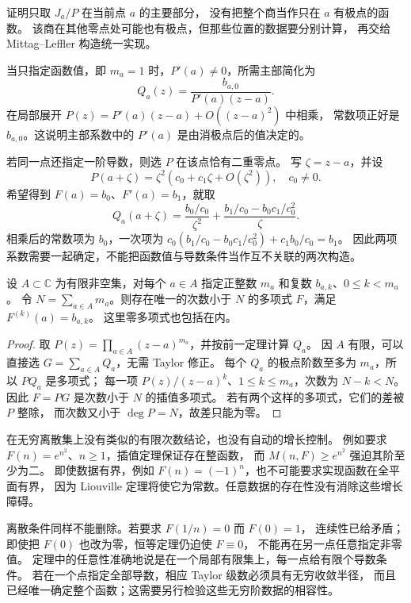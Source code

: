 证明只取 \(J_a/P\) 在当前点 \(a\) 的主要部分，
没有把整个商当作只在 \(a\) 有极点的函数。
该商在其他零点处可能也有极点，但那些位置的数据要分别计算，
再交给 Mittag–Leffler 构造统一实现。

\ProseParagraphBreak
当只指定函数值，即 \(m_a=1\) 时，\(P'(a)\ne0\)，所需主部简化为
\[
 Q_a(z)=\frac{b_{a,0}}{P'(a)(z-a)}.
\]
在局部展开 \(P(z)=P'(a)(z-a)+O((z-a)^2)\) 中相乘，
常数项正好是 \(b_{a,0}\)。这说明主部系数中的 \(P'(a)\) 是由消极点后的值决定的。

\ProseParagraphBreak
若同一点还指定一阶导数，则选 \(P\) 在该点恰有二重零点。
写 \(\zeta=z-a\)，并设
\[
 P(a+\zeta)=\zeta^2(c_0+c_1\zeta+O(\zeta^2)),\quad c_0\ne0.
\]
希望得到 \(F(a)=b_0\)、\(F'(a)=b_1\)，就取
\[
 Q_a(a+\zeta)
 =\frac{b_0/c_0}{\zeta^2}
   +\frac{b_1/c_0-b_0c_1/c_0^2}{\zeta}.
\]
相乘后的常数项为 \(b_0\)，一次项为
\(c_0(b_1/c_0-b_0c_1/c_0^2)+c_1b_0/c_0=b_1\)。
因此两项系数需要一起确定，不能把函数值与导数条件当作互不关联的两次构造。

\begin{corollary}[有限点上的多项式插值]\label{b3:cor:20-hermite-polynomial}
设 \(A\subset\mathbb C\) 为有限非空集，对每个 \(a\in A\) 指定正整数
\(m_a\) 和复数 \(b_{a,k}\)、\(0\le k<m_a\)。
令 \(N=\sum_{a\in A}m_a\)。则存在唯一的次数小于 \(N\) 的多项式
\(F\)，满足 \(F^{(k)}(a)=b_{a,k}\)。
这里零多项式也包括在内。
\end{corollary}
\begin{proof}
取 \(P(z)=\prod_{a\in A}(z-a)^{m_a}\)，并按前一定理计算 \(Q_a\)。
因 \(A\) 有限，可以直接选 \(G=\sum_{a\in A}Q_a\)，无需 Taylor 修正。
每个 \(Q_a\) 的极点阶数至多为 \(m_a\)，所以 \(P Q_a\) 是多项式；
每一项 \(P(z)/(z-a)^k\)、\(1\le k\le m_a\)，次数为 \(N-k<N\)。
因此 \(F=P G\) 是次数小于 \(N\) 的插值多项式。
若有两个这样的多项式，它们的差被 \(P\) 整除，
而次数又小于 \(\deg P=N\)，故差只能为零。
\end{proof}

在无穷离散集上没有类似的有限次数结论，也没有自动的增长控制。
例如要求 \(F(n)=e^{n^2}\)、\(n\ge1\)，插值定理保证存在整函数，
而 \(M(n,F)\ge e^{n^2}\) 强迫其阶至少为二。
即使数据有界，例如 \(F(n)=(-1)^n\)，也不可能要求实现函数在全平面有界，
因为 Liouville 定理将使它为常数。任意数据的存在性没有消除这些增长障碍。

\ProseParagraphBreak
离散条件同样不能删除。若要求 \(F(1/n)=0\) 而 \(F(0)=1\)，
连续性已给矛盾；即使把 \(F(0)\) 也改为零，恒等定理仍迫使 \(F\equiv0\)，
不能再在另一点任意指定非零值。
定理中的任意性准确地说是在一个局部有限集上，每一点给有限个导数条件。
若在一个点指定全部导数，相应 Taylor 级数必须具有无穷收敛半径，
而且已经唯一确定整个函数；这需要另行检验这些无穷阶数据的相容性。

